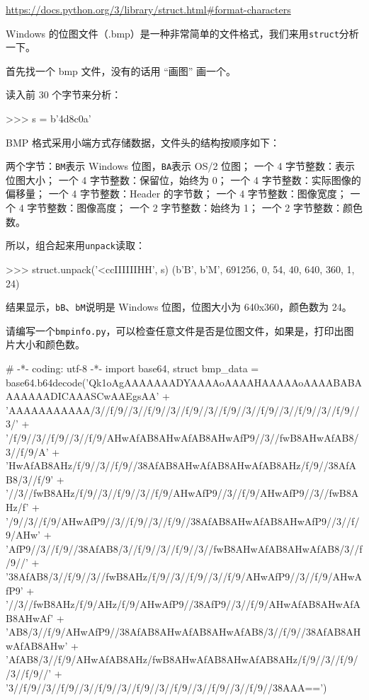 \url{https://docs.python.org/3/library/struct.html\#format-characters}

Windows
的位图文件（.bmp）是一种非常简单的文件格式，我们来用\texttt{struct}分析一下。

首先找一个 bmp 文件，没有的话用 ``画图'' 画一个。

读入前 30 个字节来分析：

\begin{pythoncode}
>>> s = b'\x4d\x8c\x0a'
\end{pythoncode}

BMP 格式采用小端方式存储数据，文件头的结构按顺序如下：

两个字节：\texttt{\textquotesingle{}BM\textquotesingle{}}表示 Windows
位图，\texttt{\textquotesingle{}BA\textquotesingle{}}表示 OS/2 位图；
一个 4 字节整数：表示位图大小； 一个 4 字节整数：保留位，始终为 0； 一个
4 字节整数：实际图像的偏移量； 一个 4 字节整数：Header 的字节数； 一个 4
字节整数：图像宽度； 一个 4 字节整数：图像高度； 一个 2 字节整数：始终为
1； 一个 2 字节整数：颜色数。

所以，组合起来用\texttt{unpack}读取：

\begin{pythoncode}
>>> struct.unpack('<ccIIIIIIHH', s)
(b'B', b'M', 691256, 0, 54, 40, 640, 360, 1, 24)
\end{pythoncode}

结果显示，\texttt{b\textquotesingle{}B\textquotesingle{}}、\texttt{b\textquotesingle{}M\textquotesingle{}}说明是
Windows 位图，位图大小为 640x360，颜色数为 24。

请编写一个\texttt{bmpinfo.py}，可以检查任意文件是否是位图文件，如果是，打印出图片大小和颜色数。

\begin{pythoncode}
# -*- coding: utf-8 -*-
import base64, struct
bmp_data = base64.b64decode('Qk1oAgAAAAAAADYAAAAoAAAAHAAAAAoAAAABABAAAAAAADICAAASCwAAEgsAA' +
                   'AAAAAAAAAAA/3//f/9//3//f/9//3//f/9//3//f/9//3//f/9//3//f/9//3//f/9//3/' +
                   '/f/9//3//f/9//3//f/9/AHwAfAB8AHwAfAB8AHwAfP9//3//fwB8AHwAfAB8/3//f/9/A' +
                   'HwAfAB8AHz/f/9//3//f/9//38AfAB8AHwAfAB8AHwAfAB8AHz/f/9//38AfAB8/3//f/9' +
                   '//3//fwB8AHz/f/9//3//f/9//3//f/9/AHwAfP9//3//f/9/AHwAfP9//3//fwB8AHz/f' +
                   '/9//3//f/9/AHwAfP9//3//f/9//3//f/9//38AfAB8AHwAfAB8AHwAfP9//3//f/9/AHw' +
                   'AfP9//3//f/9//38AfAB8/3//f/9//3//f/9//3//fwB8AHwAfAB8AHwAfAB8/3//f/9//' +
                   '38AfAB8/3//f/9//3//fwB8AHz/f/9//3//f/9//3//f/9/AHwAfP9//3//f/9/AHwAfP9' +
                   '//3//fwB8AHz/f/9/AHz/f/9/AHwAfP9//38AfP9//3//f/9/AHwAfAB8AHwAfAB8AHwAf' +
                   'AB8/3//f/9/AHwAfP9//38AfAB8AHwAfAB8AHwAfAB8/3//f/9//38AfAB8AHwAfAB8AHw' +
                   'AfAB8/3//f/9/AHwAfAB8AHz/fwB8AHwAfAB8AHwAfAB8AHz/f/9//3//f/9//3//f/9//' +
                   '3//f/9//3//f/9//3//f/9//3//f/9//3//f/9//3//f/9//3//f/9//38AAA==')
\end{pythoncode}

